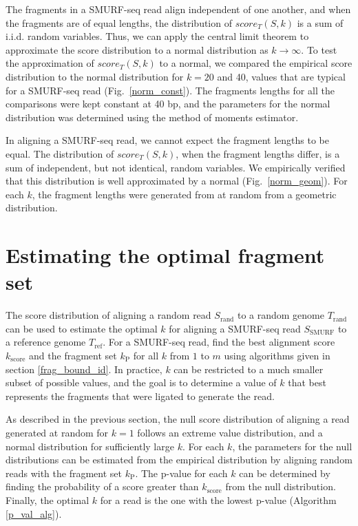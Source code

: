 The fragments in a SMURF-seq read align independent of one another, and
when the fragments are of equal lengths, the distribution of
$score_T(S,k)$ is a sum of i.i.d. random variables. Thus, we can apply
the central limit theorem to approximate the score distribution to a
normal distribution as $k \to \infty$. To test the approximation of
$score_T(S,k)$ to a normal, we compared the empirical score distribution
to the normal distribution for $k = 20$ and 40, values that are typical
for a SMURF-seq read (Fig.~\ref{norm_const}). The fragments lengths for
all the comparisons were kept constant at 40 bp, and the parameters for
the normal distribution was determined using the method of moments
estimator.

In aligning a SMURF-seq read, we cannot expect the fragment lengths to
be equal. The distribution of $score_T(S,k)$, when the fragment lengths
differ, is a sum of independent, but not identical, random variables. We
empirically verified that this distribution is well approximated by a
normal (Fig.~\ref{norm_geom}). For each $k$, the fragment lengths were
generated from at random from a geometric distribution.


\section{Estimating the optimal fragment set}
The score distribution of aligning a random read $S_\mathrm{rand}$ to a
random genome $T_\mathrm{rand}$ can be used to estimate the optimal $k$
for aligning a SMURF-seq read $S_\mathrm{SMURF}$ to a reference genome
$T_\mathrm{ref}$.
For a SMURF-seq read, find the best alignment score $k_\mathrm{score}$
and the fragment set $k_\mathrm{P}$ for all $k$ from $1$ to $m$ using
algorithms given in section \ref{frag_bound_id}. In practice, $k$ can be
restricted to a much smaller subset of possible values, and the goal is
to determine a value of $k$ that best represents the fragments that were
ligated to generate the read.
%

As described in the previous section, the null score distribution of
aligning a read generated at random for $k=1$ follows an extreme value
distribution, and a normal distribution for sufficiently large $k$.  For
each $k$, the parameters for the null distributions can be estimated
from the empirical distribution by aligning random reads with the
fragment set $k_\mathrm{P}$.
%
The p-value for each $k$ can be determined by finding the probability of
a score greater than $k_\mathrm{score}$ from the null distribution.
Finally, the optimal $k$ for a read is the one with the lowest p-value
(Algorithm \ref{p_val_alg}).

